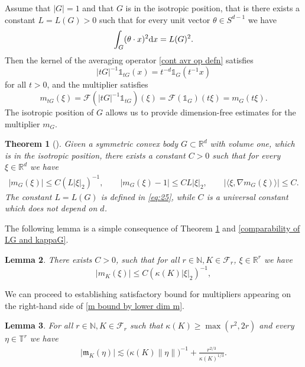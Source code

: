 \documentclass[a4paper,oneside, reqno]{amsart}
\numberwithin{equation}{section}
\newtheorem{Thm}{Theorem}[section]
\newtheorem{Lem}[Thm]{Lemma}
\theoremstyle{definition}%
\theoremstyle{definition}
\theoremstyle{definition}%
\theoremstyle{definition}
\newcommand{\R}{\mathbb{R}}
\newcommand{\N}{\mathbb{N}}
\newcommand{\T}{\mathbb{T}}
\begin{document}
Assume that $|G|=1$ and that $G$ is
in the isotropic position, that is there exists a constant $L=L(G)>0$ such that for every unit vector
$\theta \in S^{d-1}$ we have
\begin{align}
\label{eq:25}
\int_G (\theta \cdot x)^2{\rm d}x= L(G)^2.
\end{align}
Then the kernel of the averaging operator \eqref{cont avr op defn} satisfies
\[
|tG|^{-1}\mathds{1}_{tG}(x)=t^{-d}\mathds{1}_{G}(t^{-1} x)
\]
for all $t>0$, and the multiplier satisfies 
\[
m_{tG}(\xi)=\mathcal F (|tG|^{-1}\mathds{1}_{tG})(\xi)=\mathcal F(\mathds{1}_{G})(t\xi)=m_G(t\xi).
\]
The isotropic position of $G$ allows us to provide dimension-free
estimates for the multiplier $m_G$. 
\begin{Thm}[{\cite[eq. (10),(11),(12)]{B1}}]
\label{thm:cont mult bounds}
	Given  a symmetric convex body  $G\subset \R^d$ with volume one,
	which is in the isotropic
	position, there exists a
	constant $C>0$ such that for every $\xi\in\R^d$ we
	have
	\begin{align}
\label{eq:28}
	|m_G(\xi)|\leq C(L |\xi|_2)^{-1},\qquad  |m_G(\xi)-1|\leq CL
	|\xi|_2,\qquad   |\langle\xi,\nabla m_G(\xi)\rangle|\le C.
	\end{align}
	The constant $L=L(G)$ is defined  in \eqref{eq:25}, while $C$ is a
	universal constant which does not depend on $d$.
	
	
\end{Thm}
The following lemma is a simple consequence of  Theorem \ref{thm:cont mult bounds} and \eqref{comparability of LG and kappaG}.
\begin{Lem}
	\label{lem: sup sym cont m bound}
	There exists $C>0$, such that for all $r \in \N, K \in \mathcal{F}_r$, $\xi \in \R^r$ we have
	\begin{equation}
\label{eq:29}
	|m_K(\xi)|\leq C (\kappa(K) |\xi|_2)^{-1},
        \end{equation}
\end{Lem}
We can proceed to establishing satisfactory bound for multipliers appearing on the right-hand side of \eqref{m bound by lower dim m}.
\begin{Lem}

\label{m_K bound}
For all $r \in \N,K \in \mathcal{F}_r$ such that $\kappa(K) \ge \max(r^2,2r)$ and every $\eta \in \T^r$ we have  
\begin{align*}
|\mathfrak m_K(\eta)|\lesssim \big(\kappa(K)\|\eta\|\big)^{-1}+ \frac{r^{2/3}}{\kappa(K)^{1/3}}.
\end{align*}
\end{Lem}
\end{document}
